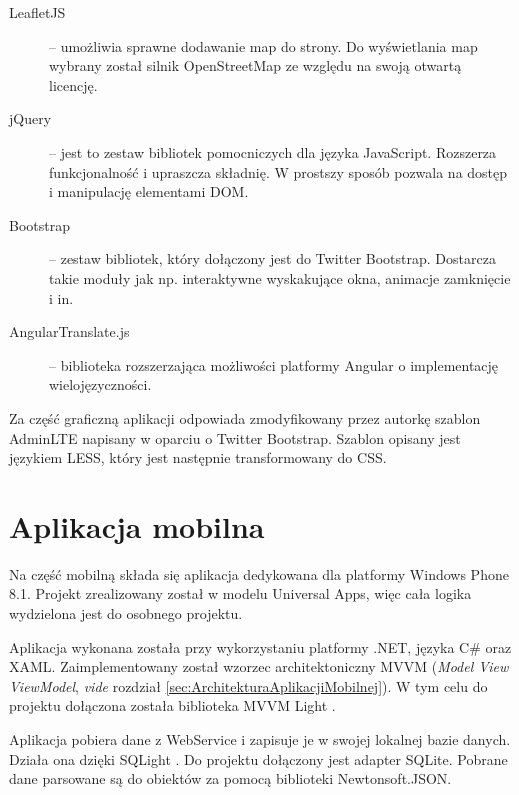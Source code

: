 \documentclass[a4paper]{book}
\begin{document}
		\begin{description}
			
			\item[LeafletJS] \cite{id:Leaflet} -- 
			umożliwia sprawne dodawanie map do strony. Do wyświetlania map wybrany został silnik OpenStreetMap \cite{id:OpenStreetMaps} ze względu na swoją otwartą licencję.
			\item[jQuery] \cite{id:jQuery} -- 
			jest to zestaw bibliotek pomocniczych dla języka JavaScript. Rozszerza funkcjonalność i upraszcza składnię. W prostszy sposób pozwala na dostęp i manipulację elementami DOM.
			\item[Bootstrap] \cite{id:Bootstrap} -- 
			zestaw bibliotek, który dołączony jest do Twitter Bootstrap. Dostarcza takie moduły jak np. interaktywne wyskakujące okna, animacje zamknięcie i in.
			\item[AngularTranslate.js] \cite{id:AngularTranslate} -- 
			biblioteka rozszerzająca możliwości platformy Angular o implementację wielojęzyczności.  
		
		\end{description}
				
		Za część graficzną aplikacji odpowiada zmodyfikowany przez autorkę szablon AdminLTE \cite{id:AdminLTE} napisany w oparciu o Twitter Bootstrap. Szablon opisany jest językiem LESS, który jest następnie transformowany do CSS.
		
		\section{Aplikacja mobilna}		
		\label{id:sec:mobile}
		Na część mobilną składa się aplikacja dedykowana dla platformy Windows Phone 8.1. Projekt zrealizowany został w modelu Universal Apps, więc cała logika wydzielona jest do osobnego projektu.
		
		Aplikacja wykonana została przy wykorzystaniu platformy .NET, języka C\# oraz XAML. Zaimplementowany został wzorzec architektoniczny MVVM (\emph{Model View ViewModel}, \emph{vide} rozdział \ref{sec:ArchitekturaAplikacjiMobilnej}). W tym celu do projektu dołączona została biblioteka MVVM Light \cite{id:MVVMLight}. 
		
		Aplikacja pobiera dane z WebService i zapisuje je w swojej lokalnej bazie danych. Działa ona dzięki SQLight \cite{id:SQLite}. Do projektu dołączony jest adapter SQLite. Pobrane dane parsowane są do obiektów za pomocą biblioteki Newtonsoft.JSON.
\end{document}
